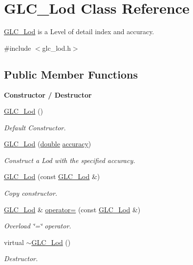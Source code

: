 \hypertarget{class_g_l_c___lod}{\section{G\-L\-C\-\_\-\-Lod Class Reference}
\label{class_g_l_c___lod}
}


\hyperlink{class_g_l_c___lod}{G\-L\-C\-\_\-\-Lod} is a Level of detail index and accuracy.  




{\ttfamily \#include $<$glc\-\_\-lod.\-h$>$}

\subsection*{Public Member Functions}
\begin{Indent}{\bf Constructor / Destructor}\par
\begin{DoxyCompactItemize}
\item 
\hyperlink{class_g_l_c___lod_ac7ddd5c02deeea9357161994830557c5}{G\-L\-C\-\_\-\-Lod} ()
\begin{DoxyCompactList}\small\item\em Default Constructor. \end{DoxyCompactList}\item 
\hyperlink{class_g_l_c___lod_aebeee1f1f337419422a26c4d61c76e00}{G\-L\-C\-\_\-\-Lod} (\hyperlink{_super_l_u_support_8h_a8956b2b9f49bf918deed98379d159ca7}{double} \hyperlink{class_g_l_c___lod_a0fef13a35738091fec85fff5922cbf8c}{accuracy})
\begin{DoxyCompactList}\small\item\em Construct a Lod with the specified accuracy. \end{DoxyCompactList}\item 
\hyperlink{class_g_l_c___lod_a0ca99b83311c4cb029e4fc70ae6b5059}{G\-L\-C\-\_\-\-Lod} (const \hyperlink{class_g_l_c___lod}{G\-L\-C\-\_\-\-Lod} \&)
\begin{DoxyCompactList}\small\item\em Copy constructor. \end{DoxyCompactList}\item 
\hyperlink{class_g_l_c___lod}{G\-L\-C\-\_\-\-Lod} \& \hyperlink{class_g_l_c___lod_ab2c46abe248c195bf0b25d1cfe5a90a2}{operator=} (const \hyperlink{class_g_l_c___lod}{G\-L\-C\-\_\-\-Lod} \&)
\begin{DoxyCompactList}\small\item\em Overload \char`\"{}=\char`\"{} operator. \end{DoxyCompactList}\item 
virtual \hyperlink{class_g_l_c___lod_a9794bacf98344b7da382493a11f816fd}{$\sim$\-G\-L\-C\-\_\-\-Lod} ()
\begin{DoxyCompactList}\small\item\em Destructor. \end{DoxyCompactList}\end{DoxyCompactItemize}
\end{Indent}
